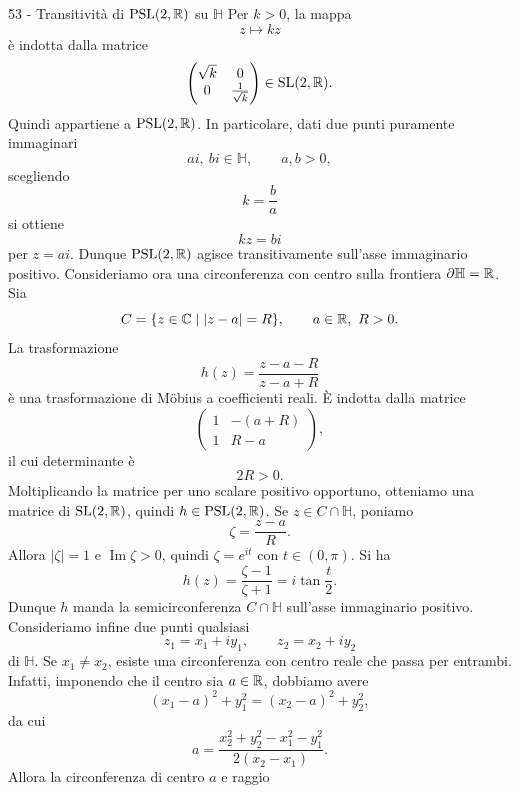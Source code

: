 \documentclass[a4paper]{article}
\begin{document}
\begin{snippetsolution}{53 - Transitività di
    \(\operatorname{PSL}(2,\mathbb{R})\) su \(\mathbb{H}\)}
    Per \(k>0\), la mappa
    \[
        z\longmapsto kz
    \]
    è indotta dalla matrice
    \[
        \begin{pmatrix}
            \sqrt{k} & 0\\
            0 & \frac{1}{\sqrt{k}}
        \end{pmatrix}
        \in\operatorname{SL}(2,\mathbb{R}).
    \]
    Quindi appartiene a \(\operatorname{PSL}(2,\mathbb{R})\). In particolare, dati due punti puramente immaginari
    \[
        ai,\ bi\in\mathbb{H},
        \qquad a,b>0,
    \]
    scegliendo
    \[
        k=\frac{b}{a}
    \]
    si ottiene
    \[
        kz=bi
    \]
    per \(z=ai\). Dunque \(\operatorname{PSL}(2,\mathbb{R})\) agisce transitivamente sull'asse immaginario positivo.
    Consideriamo ora una circonferenza con centro sulla frontiera \(\partial\mathbb{H}=\mathbb{R}\). Sia
    \[
        C=\{z\in\mathbb{C}\mid |z-a|=R\},
        \qquad a\in\mathbb{R},\ R>0.
    \]
    La trasformazione
    \[
        h(z)=\frac{z-a-R}{z-a+R}
    \]
    è una trasformazione di Möbius a coefficienti reali. È indotta dalla matrice
    \[
        \begin{pmatrix}
            1 & -(a+R)\\
            1 & R-a
        \end{pmatrix},
    \]
    il cui determinante è
    \[
        2R>0.
    \]
    Moltiplicando la matrice per uno scalare positivo opportuno, otteniamo una matrice di \(\operatorname{SL}(2,\mathbb{R})\), quindi \(h\in\operatorname{PSL}(2,\mathbb{R})\).
    Se \(z\in C\cap\mathbb{H}\), poniamo
    \[
        \zeta=\frac{z-a}{R}.
    \]
    Allora \(|\zeta|=1\) e \(\operatorname{Im}\zeta>0\), quindi \(\zeta=e^{it}\) con \(t\in(0,\pi)\). Si ha
    \[
        h(z)=\frac{\zeta-1}{\zeta+1}
        =
        i\tan\frac{t}{2}.
    \]
    Dunque \(h\) manda la semicirconferenza \(C\cap\mathbb{H}\) sull'asse immaginario positivo.
    Consideriamo infine due punti qualsiasi
    \[
        z_1=x_1+iy_1,
        \qquad
        z_2=x_2+iy_2
    \]
    di \(\mathbb{H}\). Se \(x_1\neq x_2\), esiste una circonferenza con centro reale che passa per entrambi. Infatti, imponendo che il centro sia \(a\in\mathbb{R}\), dobbiamo avere
    \[
        (x_1-a)^2+y_1^2=(x_2-a)^2+y_2^2,
    \]
    da cui
    \[
        a=
        \frac{x_2^2+y_2^2-x_1^2-y_1^2}{2(x_2-x_1)}.
    \]
    Allora la circonferenza di centro \(a\) e raggio

\end{snippetsolution}
\end{document}
